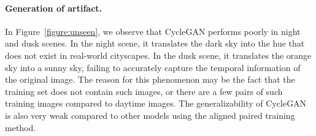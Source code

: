 \paragraph{Generation of artifact.} In Figure~\ref{figure:unseen}, we observe that CycleGAN performs poorly in night and dusk scenes. In the night scene, it translates the dark sky into the hue that does not exist in real-world cityscapes. In the dusk scene, it translates the orange sky into a sunny sky, failing to accurately capture the temporal information of the original image. The reason for this phenomenon may be the fact that the training set does not contain such images, or there are a few pairs of such training images compared to daytime images. The generalizability of CycleGAN is also very weak compared to other models using the aligned paired training method.

